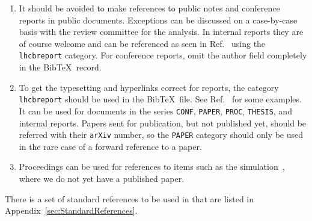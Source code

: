 \begin{enumerate}
\item It should be avoided to make references to public notes and
  conference reports in public documents. Exceptions can be discussed
  on a case-by-case basis with the review committee for the
  analysis. In internal reports they are of course welcome and can be
  referenced as seen in Ref.~\cite{LHCb-CONF-2011-003} using the
  \texttt{lhcbreport} category. For conference reports, omit the
  author field completely in the Bib\TeX\ record.

\item To get the typesetting and hyperlinks correct for \lhcb reports,
  the category \texttt{lhcbreport} should be used in the Bib\TeX\
  file. See Ref.~\cite{LHCb-INT-2011-047, *LHCb-ANA-2011-078} for some
  examples. It can be used for \lhcb documents in the series
  \texttt{CONF}, \texttt{PAPER}, \texttt{PROC}, \texttt{THESIS}, and
  internal \lhcb reports. Papers sent for publication, but not
  published yet, should be referred with their \texttt{arXiv} number,
  so the \texttt{PAPER} category should only be used in the rare case
  of a forward reference to a paper.

\item Proceedings can be used for references to items such as the
  \lhcb simulation~\cite{LHCb-PROC-2011-006}, where we do not yet have
  a published paper.

\end{enumerate}

There is a set of standard references to be used in \lhcb that are
listed in Appendix~\ref{sec:StandardReferences}.
